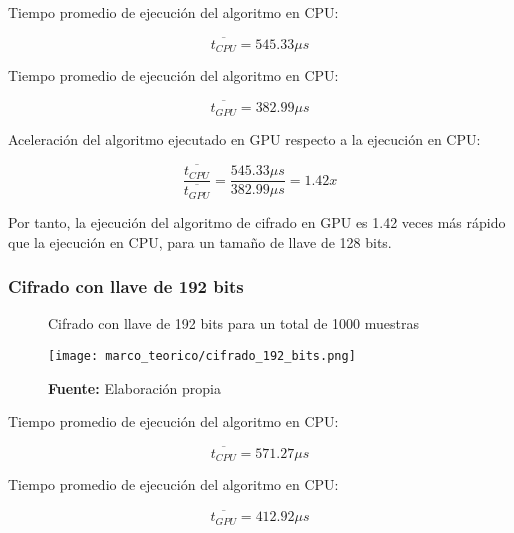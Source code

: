 \documentclass[../main/main.tex]{subfiles}
\begin{document}
        Tiempo promedio de ejecución del algoritmo en CPU:

        \vspace{-0.7cm}\begin{equation}
          \overline{t_{CPU}} = 545.33\mu s
        \end{equation}

        Tiempo promedio de ejecución del algoritmo en CPU:

        \vspace{-0.7cm}\begin{equation}
          \overline{t_{GPU}} = 382.99\mu s
        \end{equation}

        Aceleración del algoritmo ejecutado en GPU respecto a la ejecución en CPU:

        \vspace{-0.7cm}\begin{equation}
          \frac{\overline{t_{CPU}}}{\overline{t_{GPU}}} = \frac{545.33\mu s}{382.99\mu s} = 1.42x
        \end{equation}

        Por tanto, la ejecución del algoritmo de cifrado en GPU es 1.42 veces más rápido que la ejecución en CPU, para un tamaño de llave de 128 bits.

      \subsubsection{Cifrado con llave de 192 bits}

        \begin{figure}[H]
          \centering
          \caption{Cifrado con llave de 192 bits para un total de 1000 muestras}
          \texttt{[image: marco\_teorico/cifrado\_192\_bits.png]}
          \caption*{\textbf{Fuente:} Elaboración propia}
        \end{figure}

        Tiempo promedio de ejecución del algoritmo en CPU:

        \vspace{-0.7cm}\begin{equation}
          \overline{t_{CPU}} = 571.27\mu s
        \end{equation}

        Tiempo promedio de ejecución del algoritmo en CPU:

        \vspace{-0.7cm}\begin{equation}
          \overline{t_{GPU}} = 412.92\mu s
        \end{equation}
\end{document}
